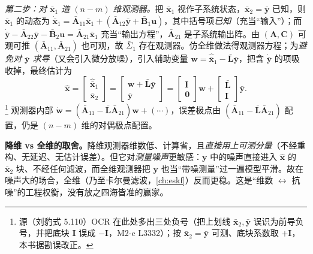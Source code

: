 \emph{第二步：对 $\bar{\mathbf x}_1$ 造 $(n-m)$ 维观测器。}\;把 $\bar{\mathbf x}_1$ 视作子系统状态，$\bar{\mathbf x}_2=\bar{\mathbf y}$ 已知，则 $\bar{\mathbf x}_1$ 的动态为 $\dot{\bar{\mathbf x}}_1=\bar{\mathbf A}_{11}\bar{\mathbf x}_1+(\bar{\mathbf A}_{12}\bar{\mathbf y}+\bar{\mathbf B}_1\mathbf u)$，其中括号项\emph{已知}（充当“输入”）；而 $\dot{\bar{\mathbf y}}-\bar{\mathbf A}_{22}\bar{\mathbf y}-\bar{\mathbf B}_2\mathbf u=\bar{\mathbf A}_{21}\bar{\mathbf x}_1$ 充当“输出方程”，$\bar{\mathbf A}_{21}$ 是子系统输出阵。由 $(\mathbf A,\mathbf C)$ 可观可推 $(\bar{\mathbf A}_{11},\bar{\mathbf A}_{21})$ 也可观，故 $\bar{\Sigma}_1$ 存在观测器。仿全维做法得观测器方程；为\emph{避免对 $\bar{\mathbf y}$ 求导}（又会引入微分放噪），引入辅助变量 $\mathbf w=\hat{\bar{\mathbf x}}_1-\bar{\mathbf L}\bar{\mathbf y}$，把含 $\dot{\bar{\mathbf y}}$ 的项吸收掉，最终估计为
\begin{equation}
  \hat{\mathbf x}=\begin{bmatrix}\hat{\bar{\mathbf x}}_1\\\bar{\mathbf x}_2\end{bmatrix}=\begin{bmatrix}\mathbf w+\bar{\mathbf L}\bar{\mathbf y}\\\bar{\mathbf y}\end{bmatrix}=\begin{bmatrix}\mathbf I\\\mathbf 0\end{bmatrix}\mathbf w+\begin{bmatrix}\bar{\mathbf L}\\\mathbf I\end{bmatrix}\bar{\mathbf y}.
  \label{eq:syn-red-est}
\end{equation}
\footnote{源（刘豹式 5.110）OCR 在此处多出三处负号（把上划线 $\bar{\mathbf x}_2,\bar{\mathbf y}$ 误识为前导负号，并把底块 $\mathbf I$ 误成 $-\mathbf I$，M2-c L3332）；按 $\bar{\mathbf x}_2=\bar{\mathbf y}$ 可测、底块系数取 $+\mathbf I$，本书据勘误改正。}
观测器内部 $\dot{\mathbf w}=(\bar{\mathbf A}_{11}-\bar{\mathbf L}\bar{\mathbf A}_{21})\mathbf w+(\cdots)$，误差极点由 $(\bar{\mathbf A}_{11}-\bar{\mathbf L}\bar{\mathbf A}_{21})$ 配置，仍是 $(n-m)$ 维的对偶极点配置。

\begin{insight}
\textbf{降维 vs 全维的取舍。}\;降维观测器维数低、计算省，且\emph{直接用上可测分量}（不经重构、无延迟、无估计误差）。但它对\emph{测量噪声}更敏感：$\mathbf y$ 中的噪声直接进入 $\hat{\mathbf x}$ 的 $\bar{\mathbf x}_2$ 块、不经任何滤波，而全维观测器把 $\mathbf y$ 也当“带噪测量”过一遍模型平滑。故在噪声大的场合，全维（乃至卡尔曼滤波，\cref{ch:eskf}）反而更稳。这是“维数 $\leftrightarrow$ 抗噪”的工程权衡，没有放之四海皆准的赢家。
\end{insight}

